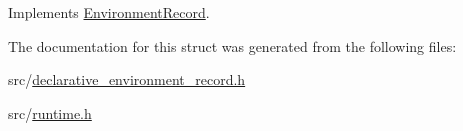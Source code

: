 Implements \hyperlink{struct_environment_record_ae5268e78f690c5f9eb50d8abe2342fff}{Environment\+Record}.



The documentation for this struct was generated from the following files\+:\begin{DoxyCompactItemize}
\item 
src/\hyperlink{declarative__environment__record_8h}{declarative\+\_\+environment\+\_\+record.\+h}\item 
src/\hyperlink{runtime_8h}{runtime.\+h}\end{DoxyCompactItemize}
